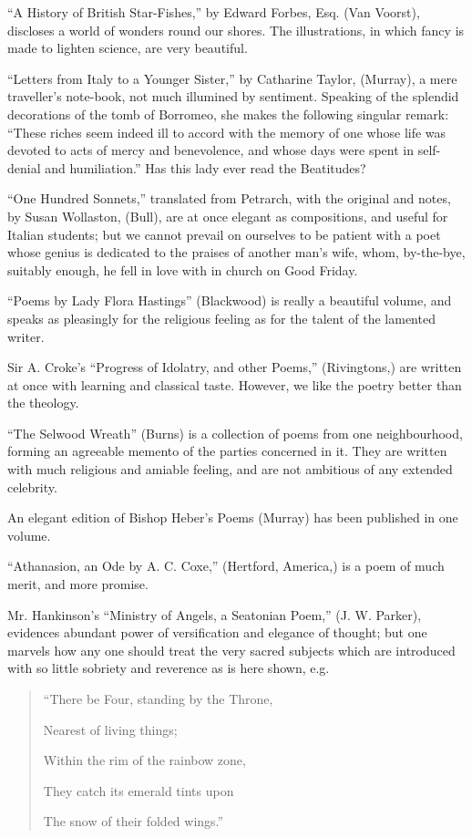 ``A History of British Star-Fishes,'' by Edward
Forbes, Esq. (Van Voorst), discloses a world of wonders round our
shores. The illustrations, in which fancy is made to lighten science,
are very beautiful.

``Letters from Italy to a Younger Sister,'' by
Catharine Taylor, (Murray), a mere traveller's note-book, not much
illumined by sentiment. Speaking of the splendid decorations of the tomb
of Borromeo, she makes the following singular remark: ``These riches seem
indeed ill to accord with the memory of one whose life was devoted to
acts of mercy and benevolence, and whose days were spent in self-denial
and humiliation.'' Has this lady ever read the Beatitudes?

``One Hundred Sonnets,'' translated from Petrarch,
with the original and notes, by Susan Wollaston, (Bull), are at once
elegant as compositions, and useful for Italian students; but we cannot
prevail on ourselves to be patient with a poet whose genius is dedicated
to the praises of another man's wife, whom, by-the-bye, suitably enough,
he fell in love with in church on Good Friday.

``Poems by Lady Flora Hastings'' (Blackwood) is
really a beautiful volume, and speaks as pleasingly for the religious
feeling as for the talent of the lamented writer.

Sir A. Croke's ``Progress of Idolatry, and other
Poems,'' (Rivingtons,) are written at once with learning and classical
taste. However, we like the poetry better than the theology.

``The Selwood Wreath'' (Burns) is a collection of
poems from one neighbourhood, forming an agreeable memento of the
parties concerned in it. They are written with much religious and
amiable feeling, and are not ambitious of any extended celebrity.

An elegant edition of Bishop Heber's Poems (Murray)
has been published in one volume.

``Athanasion, an Ode by A. C. Coxe,'' (Hertford,
America,) is a poem of much merit, and more promise.

Mr. Hankinson's ``Ministry of Angels, a Seatonian
Poem,'' (J. W. Parker), evidences abundant power of versification and
elegance of thought; but one marvels how any one should treat the very
sacred subjects which are introduced with so little sobriety and
reverence as is here shown, e.g.

\begin{quote}

``There be Four, standing by the
Throne,

Nearest of living things;

Within the rim of the rainbow zone,

They catch its emerald tints upon

The snow of their folded wings.''

\end{quote}

